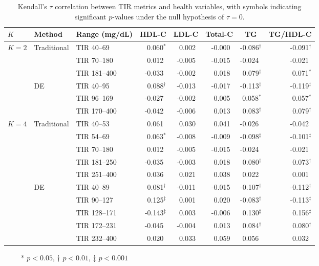 \begin{table}[htbp]
\centering
\caption{Kendall's $\tau$ correlation between TIR metrics and health variables, with symbols indicating significant $p$-values under the null hypothesis of $\tau = 0$.}
\label{tab:kendall_tau}
\footnotesize
\begin{tabular}{lllrrrrr}
\toprule
$K$ & Method & Range (mg/dL) & \multicolumn{1}{c}{HDL-C} & \multicolumn{1}{c}{LDL-C} & \multicolumn{1}{c}{Total-C} & \multicolumn{1}{c}{TG} & \multicolumn{1}{c}{TG/HDL-C} \\
\midrule
\multirow{6.6}{*}{$K=2$} & \multirow{3}{*}{Traditional} & TIR 40--69 & 0.060$^*$ & 0.002$\:\,$ & -0.000$\:\,$ & -0.086$^\dagger$ & -0.091$^\dagger$ \\
 &  & TIR 70--180 & 0.012$\:\,$ & -0.005$\:\,$ & -0.015$\:\,$ & -0.024$\:\,$ & -0.021$\:\,$ \\
 &  & TIR 181--400 & -0.033$\:\,$ & -0.002$\:\,$ & 0.018$\:\,$ & 0.079$^\dagger$ & 0.071$^*$ \\
\cmidrule(lr){2-8}
 & \multirow{3}{*}{DE} & TIR 40--95 & 0.088$^\dagger$ & -0.013$\:\,$ & -0.017$\:\,$ & -0.113$^\ddagger$ & -0.119$^\ddagger$ \\
 &  & TIR 96--169 & -0.027$\:\,$ & -0.002$\:\,$ & 0.005$\:\,$ & 0.058$^*$ & 0.057$^*$ \\
 &  & TIR 170--400 & -0.042$\:\,$ & -0.006$\:\,$ & 0.013$\:\,$ & 0.083$^\dagger$ & 0.079$^\dagger$ \\
\midrule
\multirow{10.6}{*}{$K=4$} & \multirow{5}{*}{Traditional} & TIR 40--53 & 0.061$\:\,$ & 0.030$\:\,$ & 0.041$\:\,$ & -0.026$\:\,$ & -0.042$\:\,$ \\
 &  & TIR 54--69 & 0.063$^*$ & -0.008$\:\,$ & -0.009$\:\,$ & -0.098$^\ddagger$ & -0.101$^\ddagger$ \\
 &  & TIR 70--180 & 0.012$\:\,$ & -0.005$\:\,$ & -0.015$\:\,$ & -0.024$\:\,$ & -0.021$\:\,$ \\
 &  & TIR 181--250 & -0.035$\:\,$ & -0.003$\:\,$ & 0.018$\:\,$ & 0.080$^\dagger$ & 0.073$^\dagger$ \\
 &  & TIR 251--400 & 0.036$\:\,$ & 0.021$\:\,$ & 0.038$\:\,$ & 0.022$\:\,$ & 0.001$\:\,$ \\
\cmidrule(lr){2-8}
 & \multirow{5}{*}{DE} & TIR 40--89 & 0.081$^\dagger$ & -0.011$\:\,$ & -0.015$\:\,$ & -0.107$^\ddagger$ & -0.112$^\ddagger$ \\
 &  & TIR 90--127 & 0.125$^\ddagger$ & 0.001$\:\,$ & 0.020$\:\,$ & -0.083$^\dagger$ & -0.113$^\ddagger$ \\
 &  & TIR 128--171 & -0.143$^\ddagger$ & 0.003$\:\,$ & -0.006$\:\,$ & 0.130$^\ddagger$ & 0.156$^\ddagger$ \\
 &  & TIR 172--231 & -0.045$\:\,$ & -0.004$\:\,$ & 0.013$\:\,$ & 0.084$^\dagger$ & 0.080$^\dagger$ \\
 &  & TIR 232--400 & 0.020$\:\,$ & 0.033$\:\,$ & 0.059$\:\,$ & 0.056$\:\,$ & 0.032$\:\,$ \\
\bottomrule
\end{tabular}
\begin{tablenotes}
\scriptsize
\item $\qquad$ * $p<0.05$, † $p<0.01$, ‡ $p<0.001$
\end{tablenotes}
\end{table}